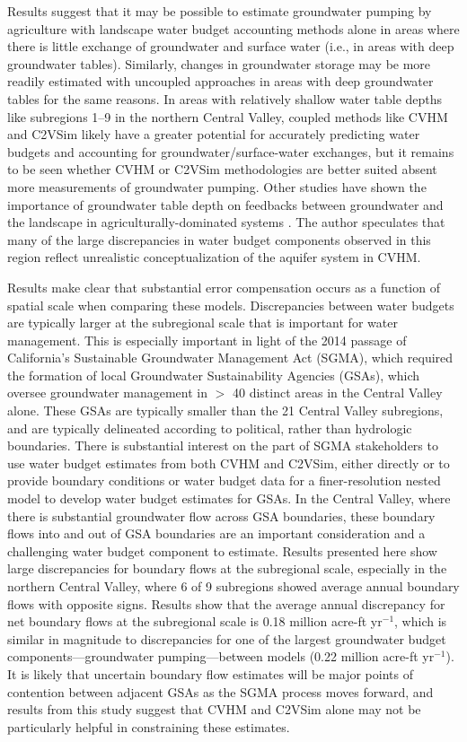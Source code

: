 Results suggest that it may be possible to estimate groundwater pumping by agriculture with landscape water budget accounting methods alone in areas where there is little exchange of groundwater and surface water (i.e., in areas with deep groundwater tables). Similarly, changes in groundwater storage may be more readily estimated with uncoupled approaches in areas with deep groundwater tables for the same reasons. In areas with relatively shallow water table depths like subregions 1--9 in the northern Central Valley, coupled methods like CVHM and C2VSim likely have a greater potential for accurately predicting water budgets and accounting for groundwater/surface-water exchanges, but it remains to be seen whether CVHM or C2VSim methodologies are better suited absent more measurements of groundwater pumping. Other studies have shown the importance of groundwater table depth on feedbacks between groundwater and the landscape in agriculturally-dominated systems \citep{condon2014feedbacks, condon2014groundwater}. The author speculates that many of the large discrepancies in water budget components observed in this region reflect unrealistic conceptualization of the aquifer system in CVHM.

Results make clear that substantial error compensation occurs as a function of spatial scale when comparing these models. Discrepancies between water budgets are typically larger at the subregional scale that is important for water management. This is especially important in light of the 2014 passage of California’s Sustainable Groundwater Management Act (SGMA), which required the formation of local Groundwater Sustainability Agencies (GSAs), which oversee groundwater management in $>$ 40 distinct areas in the Central Valley alone. These GSAs are typically smaller than the 21 Central Valley subregions, and are typically delineated according to political, rather than hydrologic boundaries. There is substantial interest on the part of SGMA stakeholders to use water budget estimates from both CVHM and C2VSim, either directly or to provide boundary conditions or water budget data for a finer-resolution nested model to develop water budget estimates for GSAs. In the Central Valley, where there is substantial groundwater flow across GSA boundaries, these boundary flows into and out of GSA boundaries are an important consideration and a challenging water budget component to estimate. Results presented here show large discrepancies for boundary flows at the subregional scale, especially in the northern Central Valley, where 6 of 9 subregions showed average annual boundary flows with opposite signs. Results show that the average annual discrepancy for net boundary flows at the subregional scale is 0.18 million acre-ft yr$^{-1}$, which is similar in magnitude to discrepancies for one of the largest groundwater budget components---groundwater pumping---between models (0.22 million acre-ft yr$^{-1}$). It is likely that uncertain boundary flow estimates will be major points of contention between adjacent GSAs as the SGMA process moves forward, and results from this study suggest that CVHM and C2VSim alone may not be particularly helpful in constraining these estimates.

